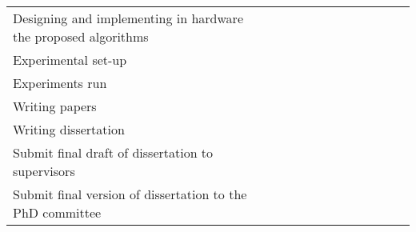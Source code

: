 \documentclass[authoryear,11pt]{elsarticle}
\begin{document}
\begin{table}[h!]
\begin{tabular}{|p{8cm}|c|c|c|c|c|c|c|c|c|c|c|c|}
		&&&&&&&\cellcolor[gray]{0.9}&\cellcolor[gray]{0.9}&\cellcolor[gray]{0.9}&&&\\
		\hline
		Designing and implementing in hardware the proposed algorithms
		&&&&&&&&\cellcolor[gray]{0.9}&\cellcolor[gray]{0.9}&&&\\
		\hline
		Experimental set-up &\cellcolor{blue}&\cellcolor{blue}&&\cellcolor[gray]{0.9}&
		\cellcolor[gray]{0.9}&&\cellcolor[gray]{0.9}&\cellcolor[gray]{0.9}&&&&\\
		\hline
		Experiments run &&&\cellcolor{blue}&\cellcolor[gray]{0.9}&&\cellcolor[gray]{0.9}&\cellcolor[gray]{0.9}&&
		\cellcolor[gray]{0.9}&&&\\
		\hline
		Writing papers &\cellcolor{blue}&&\cellcolor{blue}&&\cellcolor[gray]{0.9}&&\cellcolor[gray]{0.9}&&
		\cellcolor[gray]{0.9}&&&\\
		\hline
		Writing dissertation &&&&\cellcolor[gray]{0.9}&\cellcolor[gray]{0.9}&\cellcolor[gray]{0.9}&
		\cellcolor[gray]{0.9}&\cellcolor[gray]{0.9}&\cellcolor[gray]{0.9}&&&\\
		\hline
		Submit final draft of dissertation to supervisors &&&&&&&&&&\cellcolor[gray]{0.9}&&\\
		\hline
		Submit final version of dissertation to the PhD committee &&&&&&&&&&&\cellcolor[gray]{0.9}&\\
		\hline
		
 	\end{tabular}             
 \end{table}
 
	  	
\end{document}
